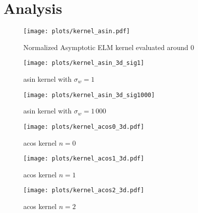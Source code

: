 \section{Analysis}

\begin{figure}
    \texttt{[image: plots/kernel\_asin.pdf]}
    \caption{Normalized Asymptotic ELM kernel evaluated around 0}
\end{figure}

\begin{figure}
    \texttt{[image: plots/kernel\_asin\_3d\_sig1]}
    \caption{asin kernel with $\sigma_w=1$}
\end{figure}

\begin{figure}
    \texttt{[image: plots/kernel\_asin\_3d\_sig1000]}
    \caption{asin kernel with $\sigma_w=1\,000$}
\end{figure}


\begin{figure}
    \texttt{[image: plots/kernel\_acos0\_3d.pdf]}
    \caption{acos kernel $n=0$}
\end{figure}

\begin{figure}
    \texttt{[image: plots/kernel\_acos1\_3d.pdf]}
    \caption{acos kernel $n=1$}
\end{figure}

\begin{figure}
    \texttt{[image: plots/kernel\_acos2\_3d.pdf]}
    \caption{acos kernel $n=2$}
\end{figure}
